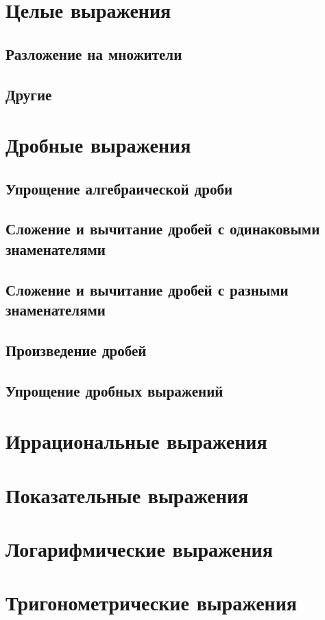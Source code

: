\documentclass[10pt, a4paper]{article}
\begin{document}
\section{Целые выражения}
	\subsection{Разложение на множители}
	\subsection{Другие}
\section{Дробные выражения}
	\subsection{Упрощение алгебраической дроби}
	\subsection{Сложение и вычитание дробей с одинаковыми знаменателями}
	\subsection{Сложение и вычитание дробей с разными знаменателями}
	\subsection{Произведение дробей}
	\subsection{Упрощение дробных выражений}
\section{Иррациональные выражения}
\section{Показательные выражения}
\section{Логарифмические выражения}
\section{Тригонометрические выражения}
\end{document}
